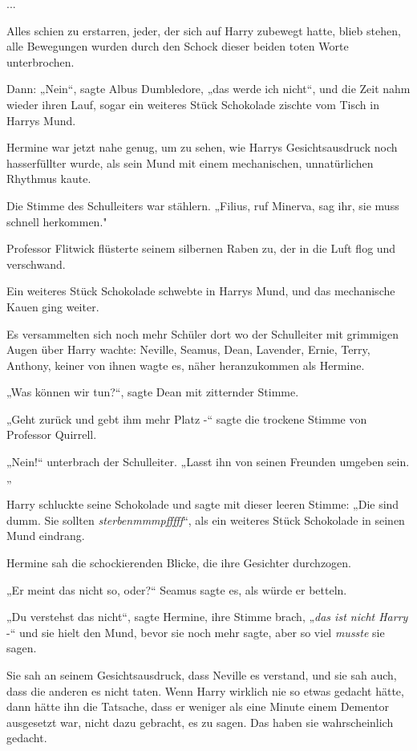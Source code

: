 {...

Alles schien zu erstarren, jeder, der sich auf Harry zubewegt hatte, blieb stehen, alle Bewegungen wurden durch den Schock dieser beiden toten Worte unterbrochen.

Dann: „Nein“, sagte Albus Dumbledore, „das werde ich nicht“, und die Zeit nahm wieder ihren Lauf, sogar ein weiteres Stück Schokolade zischte vom Tisch in Harrys Mund.

Hermine war jetzt nahe genug, um zu sehen, wie Harrys Gesichtsausdruck noch hasserfüllter wurde, als sein Mund mit einem mechanischen, unnatürlichen Rhythmus kaute.

Die Stimme des Schulleiters war stählern. „Filius, ruf Minerva, sag ihr, sie muss schnell herkommen."

Professor Flitwick flüsterte seinem silbernen Raben zu, der in die Luft flog und verschwand.

Ein weiteres Stück Schokolade schwebte in Harrys Mund, und das mechanische Kauen ging weiter.

Es versammelten sich noch mehr Schüler dort wo der Schulleiter mit grimmigen Augen über Harry wachte: Neville, Seamus, Dean, Lavender, Ernie, Terry, Anthony, keiner von ihnen wagte es, näher heranzukommen als Hermine.

„Was können wir tun?“, sagte Dean mit zitternder Stimme.

„Geht zurück und gebt ihm mehr Platz -“ sagte die trockene Stimme von Professor Quirrell.

„Nein!“ unterbrach der Schulleiter. „Lasst ihn von seinen Freunden umgeben sein.„

Harry schluckte seine Schokolade und sagte mit dieser leeren Stimme: „Die sind dumm. Sie sollten \emph{sterbenmmmpfffff}“, als ein weiteres Stück Schokolade in seinen Mund eindrang.

Hermine sah die schockierenden Blicke, die ihre Gesichter durchzogen.

„Er meint das nicht so, oder?“ Seamus sagte es, als würde er betteln.

„Du verstehst das nicht“, sagte Hermine, ihre Stimme brach, „\emph{das ist nicht Harry} -“ und sie hielt den Mund, bevor sie noch mehr sagte, aber so viel \emph{musste} sie sagen.

Sie sah an seinem Gesichtsausdruck, dass Neville es verstand, und sie sah auch, dass die anderen es nicht taten. Wenn Harry wirklich nie so etwas gedacht hätte, dann hätte ihn die Tatsache, dass er weniger als eine Minute einem Dementor ausgesetzt war, nicht dazu gebracht, es zu sagen. Das haben sie wahrscheinlich gedacht.

}
